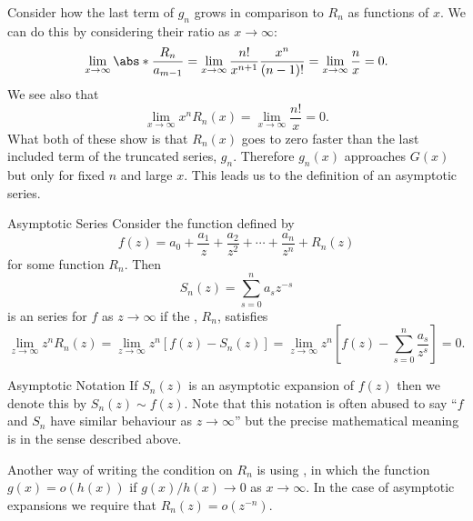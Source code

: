 \documentclass[fleqn]{NotesClass}
\begin{document}
    Consider how the last term of \(g_n\) grows in comparison to \(R_n\) as functions of \(x\).
    We can do this by considering their ratio as \(x \to \infty\):
    \begin{equation}
        \lim_{x\to\infty} \abs*{\frac{R_n}{a_{m-1}}} = \lim_{x\to\infty} \frac{n!}{x^{n+1}}\frac{x^n}{(n-1)!} = \lim_{x\to\infty} \frac{n}{x} = 0.
    \end{equation}
    We see also that
    \begin{equation}
        \lim_{x\to\infty} x^nR_n(x) = \lim_{x\to\infty} \frac{n!}{x} = 0.
    \end{equation}
    What both of these show is that \(R_n(x)\) goes to zero faster than the last included term of the truncated series, \(g_n\).
    Therefore \(g_n(x)\) approaches \(G(x)\) but only for fixed \(n\) and large \(x\).
    This leads us to the definition of an asymptotic series.
    
    \begin{dfn}{Asymptotic Series}{}
        Consider the function defined by
        \begin{equation}
            f(z) = a_0 + \frac{a_1}{z} + \frac{a_2}{z^2} + \dotsb + \frac{a_n}{z^n} + R_n(z)
        \end{equation}
        for some function \(R_n\).
        Then
        \begin{equation}
            S_n(z) = \sum_{s=0}^{n}a_sz^{-s}
        \end{equation}
        is an  series for \(f\) as \(z \to \infty\) if the , \(R_n\), satisfies
        \begin{equation}
            \lim_{z\to\infty} z^nR_n(z) = \lim_{z\to\infty} z^n
            [f(z) -  S_n(z)] = \lim_{z\to\infty} z^n\left[ f(z) - \sum_{s=0}^{n} \frac{a_s}{z^s} \right] = 0.
        \end{equation}
    \end{dfn}
    
    \begin{ntn}{Asymptotic Notation}{}
        If \(S_n(z)\) is an asymptotic expansion of \(f(z)\) then we denote this by \(S_n(z) \sim f(z)\).
        Note that this notation is often abused to say \enquote{\(f\) and \(S_n\) have similar behaviour as \(z \to \infty\)} but the precise mathematical meaning is in the sense described above.
        
        Another way of writing the condition on \(R_n\) is using , in which the function \(g(x) = o(h(x))\) if \(g(x)/h(x) \to 0\) as \(x \to \infty\).
        In the case of asymptotic expansions we require that \(R_n(z) = o(z^{-n})\).
    \end{ntn}
\end{document}
